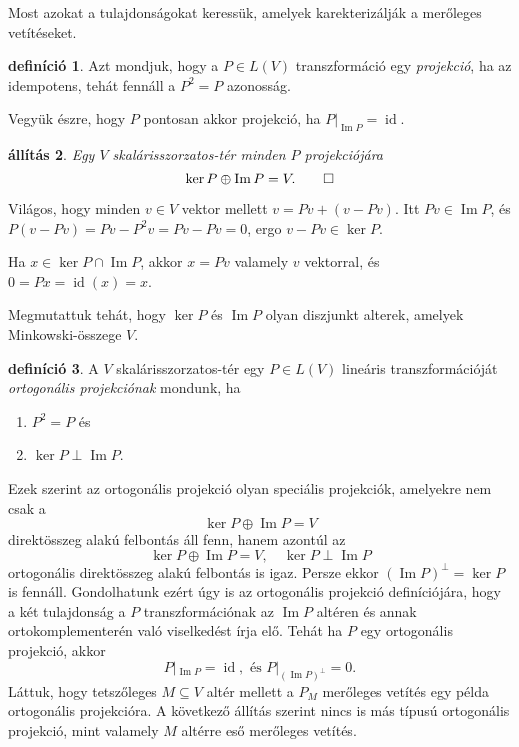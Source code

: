 \documentclass[a4paper, showtrims]{memoir}
\makeatletter
\renewenvironment{proof}[1][\proofname]
    {\par\pushQED{\qed}%
    \normalfont \topsep6\p@\@plus6\p@\relax
    \trivlist
    \item[\hskip\labelsep
        \itshape
    #1\@addpunct{:}]\ignorespaces}
    {\popQED\endtrivlist\@endpefalse}
\theoremstyle{plain}
\newtheorem{proposition}{állítás}[chapter]
\theoremstyle{remark}
\theoremstyle{definition}
\newtheorem{definition}[proposition]{definíció}
\DeclareMathOperator{\id}{id}
\DeclareMathOperator{\im}{Im}
\makeatother
\begin{document}
Most azokat a tulajdonságokat keressük, amelyek karekterizálják a merőleges vetítéseket.
\begin{definition}
	Azt mondjuk, hogy a $P\in L\left( V \right)$ transzformáció egy
	\emph{projekció},
	ha az idempotens, tehát fennáll a $P^2=P$ azonosság.
\end{definition}
Vegyük észre, hogy $P$ pontosan akkor projekció, ha $P|_{\im P}=\id.$
\begin{proposition}
	Egy $V$ skalárisszorzatos-tér minden $P$ projekciójára
	\[
		\ker P\oplus\im P=V.
		\qedhere
	\]
\end{proposition}
\begin{proof}
    Világos, hogy minden $v\in V$ vektor mellett
    $v=Pv+\left( v-Pv \right)$. 
    Itt $Pv\in\im P$, és $P\left( v-Pv \right)=Pv-P^2v=Pv-Pv=0$,
    ergo $v-Pv\in\ker P$.

    Ha $x\in\ker P\cap\im P$, akkor $x=Pv$ valamely $v$ vektorral, 
    és $0=Px=\id(x)=x$.

    Megmutattuk tehát, hogy $\ker P$ és $\im P$ olyan diszjunkt alterek, amelyek Minkowski-összege $V$.
\end{proof}
\begin{definition}
	A $V$ skalárisszorzatos-tér egy $P\in L\left( V \right)$ lineáris transzformációját
	\emph{ortogonális projekciónak}
	mondunk, ha
	\begin{enumerate}
		\item $P^2=P$ és
		\item $\ker P\perp\im P$.
		      \qedhere
	\end{enumerate}
\end{definition}
Ezek szerint az ortogonális projekció olyan speciális projekciók, amelyekre nem csak a
\[
    \ker P\oplus\im P=V
\]
direktösszeg alakú felbontás áll fenn, hanem azontúl az
\[
    \ker P\oplus\im P=V,\quad \ker P\perp\im P
\]
ortogonális direktösszeg alakú felbontás is igaz. Persze ekkor 
$\left( \im P \right)^\perp=\ker P$ is fennáll.
Gondolhatunk ezért úgy is az ortogonális projekció definíciójára, hogy a két tulajdonság a $P$ transzformációnak az $\im P$ altéren és annak ortokomplementerén való viselkedést írja elő.
Tehát ha $P$ egy ortogonális projekció, akkor
\[
    P|_{\im P}=\id,
    \text{ és }
    P|_{{\left( \im P \right)}^\perp}=0.
\]
Láttuk, hogy tetszőleges $M\subseteq V$ altér mellett a $P_M$ merőleges vetítés egy példa ortogonális projekcióra. 
A következő állítás szerint nincs is más típusú ortogonális projekció,
mint valamely $M$ altérre eső merőleges vetítés.
\end{document}
